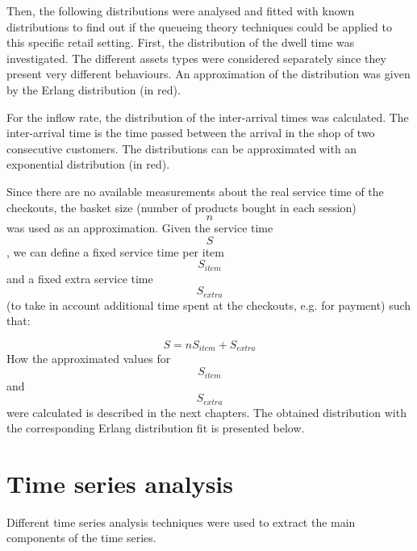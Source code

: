 Then, the following distributions were analysed and fitted with known distributions to find out if the queueing theory techniques could be applied to this specific retail setting.
First, the distribution of the dwell time was investigated. The different assets types were considered separately since they present very different behaviours. An approximation of the distribution was given by the Erlang distribution (in red).

For the inflow rate, the distribution of the inter-arrival times was calculated. The inter-arrival time is the time passed between the arrival in the shop of two consecutive customers. The distributions can be approximated with an exponential distribution (in red).

Since there are no available measurements about the real service time of the checkouts, the basket size (number of products bought in each session) $$ n $$ was used as an approximation. Given the service time $$ S $$, we can define a fixed service time per item $$ S_{item} $$ and a fixed extra service time $$ S_{extra} $$ (to take in account additional time spent at the checkouts, e.g. for payment) such that:

$$ S = n S_{item} + S_{extra} $$
How the approximated values for $$ S_{item} $$ and $$ S_{extra} $$ were calculated is described in the next chapters.
The obtained distribution with the corresponding Erlang distribution fit is presented below.


\section{Time series analysis}
\label{sec:time_series_analysis}
Different time series analysis techniques were used to extract the main components of the time series.

